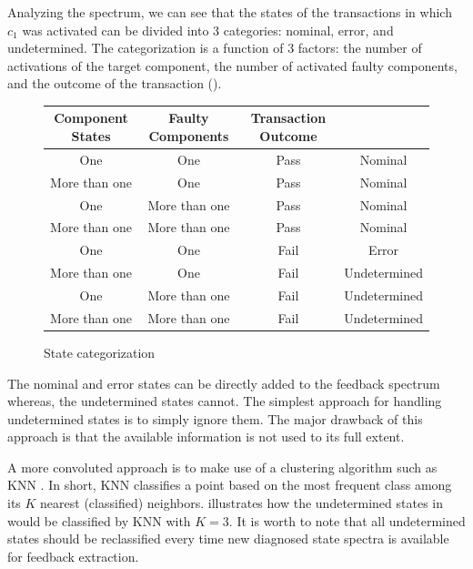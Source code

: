 Analyzing the spectrum, we can see that the states of the transactions
in which $c_1$ was activated can be divided into $3$ categories:
nominal, error, and undetermined.
%
The categorization is a function of $3$ factors: the number of
activations of the target component, the number of activated faulty
components, and the outcome of the transaction
().

\begin{figure}[!ht]
  \renewcommand{\arraystretch}{1.2}
  \begin{tabular}{ccc|c}
    Component States & Faulty Components & Transaction Outcome &                                        \\\hline
    One              & One               & Pass                & \cellcolor{clra} Nominal      \\
    More than one    & One               & Pass                & \cellcolor{clra} Nominal      \\
    One              & More than one     & Pass                & \cellcolor{clra} Nominal      \\
    More than one    & More than one     & Pass                & \cellcolor{clra} Nominal      \\
    One              & One               & Fail                & \cellcolor{clrb} Error      \\
    More than one    & One               & Fail                & \cellcolor{clrc} Undetermined \\
    One              & More than one     & Fail                & \cellcolor{clrc} Undetermined \\
    More than one    & More than one     & Fail                & \cellcolor{clrc} Undetermined \\

  \end{tabular}
  \caption{State categorization}
  \label{fig:conclusions:state-categorization}
\end{figure}

The nominal and error states can be directly added to the feedback
spectrum whereas, the undetermined states cannot.
%
The simplest approach for handling undetermined states is to simply
ignore them.
%
The major drawback of this approach is that the available information
is not used to its full extent.

A more convoluted approach is to make use of a clustering algorithm
such as \ac{KNN} \citep{Altman92}.
%
In short, \ac{KNN} classifies a point based on the most frequent class
among its $K$ nearest (classified) neighbors.
%
 illustrates how the undetermined states in
 would be classified by \ac{KNN}
with $K=3$.
%
It is worth to note that all undetermined states should be
reclassified every time new diagnosed state spectra is available for
feedback extraction.

